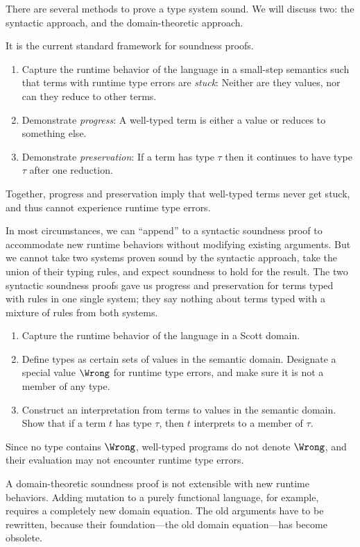 \documentclass{amsart}
\begin{document}
There are several methods to prove a type system sound. We will
discuss two: the syntactic approach, and the domain-theoretic
approach.


It is the current standard framework for soundness proofs.
\begin{enumerate}
\item Capture the runtime behavior of the language in a
small-step semantics such that terms with runtime type errors are
\emph{stuck}: Neither are they values, nor can they reduce to
other terms.
\item Demonstrate \emph{progress}: A well-typed term is either a
value or reduces to something else.
\item Demonstrate \emph{preservation}: If a term has type $\tau$
then it continues to have type $\tau$ after one reduction.
\end{enumerate}
Together, progress and preservation imply that well-typed terms
never get stuck, and thus cannot experience runtime type errors.

In most circumstances, we can ``append'' to a syntactic soundness
proof to accommodate new runtime behaviors without modifying
existing arguments. But we cannot take two systems proven sound
by the syntactic approach, take the union of their typing rules,
and expect soundness to hold for the result. The two syntactic
soundness proofs gave us progress and preservation for terms
typed with rules in one single system; they say nothing about
terms typed with a mixture of rules from both systems.


\begin{enumerate}
\item Capture the runtime behavior of the language in a Scott
domain.
\item Define types as certain sets of values in the semantic
domain. Designate a special value $\Wrong$ for runtime type
errors, and make sure it is not a member of any type.
\item Construct an interpretation from terms to values in the
semantic domain. Show that if a term $t$ has type $\tau$, then
$t$ interprets to a member of $\tau$.
\end{enumerate}
Since no type contains $\Wrong$, well-typed programs do not
denote $\Wrong$, and their evaluation may not encounter runtime
type errors.

A domain-theoretic soundness proof is not extensible with new
runtime behaviors. Adding mutation to a purely functional
language, for example, requires a completely new domain equation.
The old arguments have to be rewritten, because their
foundation---the old domain equation---has become obsolete.
\end{document}
